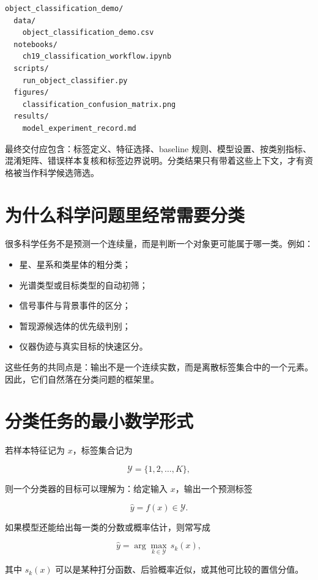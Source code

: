 \begin{examplebox}[最小分类项目结构]
\begin{lstlisting}[style=terminal]
object_classification_demo/
  data/
    object_classification_demo.csv
  notebooks/
    ch19_classification_workflow.ipynb
  scripts/
    run_object_classifier.py
  figures/
    classification_confusion_matrix.png
  results/
    model_experiment_record.md
\end{lstlisting}
\end{examplebox}

最终交付应包含：标签定义、特征选择、baseline 规则、模型设置、按类别指标、混淆矩阵、错误样本复核和标签边界说明。分类结果只有带着这些上下文，才有资格被当作科学候选筛选。

\section{为什么科学问题里经常需要分类}

很多科学任务不是预测一个连续量，而是判断一个对象更可能属于哪一类。例如：

\begin{itemize}
    \item 星、星系和类星体的粗分类；
    \item 光谱类型或目标类型的自动初筛；
    \item 信号事件与背景事件的区分；
    \item 暂现源候选体的优先级判别；
    \item 仪器伪迹与真实目标的快速区分。
\end{itemize}

这些任务的共同点是：输出不是一个连续实数，而是离散标签集合中的一个元素。因此，它们自然落在分类问题的框架里。

\section{分类任务的最小数学形式}

若样本特征记为 $x$，标签集合记为

\[
\mathcal{Y} = \{1,2,\dots,K\},
\]

则一个分类器的目标可以理解为：给定输入 $x$，输出一个预测标签

\[
\hat{y} = f(x) \in \mathcal{Y}.
\]

如果模型还能给出每一类的分数或概率估计，则常写成

\[
\hat{y} = \arg\max_{k \in \mathcal{Y}} \, s_k(x),
\]

其中 $s_k(x)$ 可以是某种打分函数、后验概率近似，或其他可比较的置信分值。

